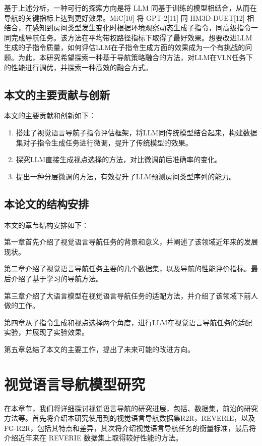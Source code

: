 \documentclass[bachelor]{thesis-uestc}
\begin{document}
基于上述分析，一种可行的探索方向是将 LLM 同基于训练的模型相结合，从而在导航的关键指标上达到更好效果。MiC[10] 将 GPT-2[11] 同 HM3D-DUET[12] 相结合，在感知到房间类型发生变化时根据环境观察动态生成子指令，同高级指令一同完成导航任务。该方法在平均带权路径指标下取得了最好效果。想要改进LLM生成的子指令质量，如何评估LLM在子指令生成方面的效果成为一个有挑战的问题。为此，本研究希望探索一种基于导航策略融合的方法，对LLM在VLN任务下的性能进行调优，并探索一种高效的融合方式。

\section{本文的主要贡献与创新}

本文的主要贡献和创新如下：
\begin{enumerate}
    \item 搭建了视觉语言导航子指令评估框架，将LLM同传统模型结合起来，构建数据集对子指令生成任务进行微调，提升了传统模型的效果。
    \item 探究LLM直接生成视点选择的方法，对比微调前后准确率的变化。
    \item 提出一种分层微调的方法，有效提升了LLM预测房间类型序列的能力。
\end{enumerate}
\section{本论文的结构安排}

本文的章节结构安排如下：

第一章首先介绍了视觉语言导航任务的背景和意义，并阐述了该领域近年来的发展现状。

第二章介绍了视觉语言导航任务主要的几个数据集，以及导航的性能评价指标。最后介绍了基于学习的导航方法。

第三章介绍了大语言模型在视觉语言导航任务的适配方法，并介绍了该领域下前人做的工作。

第四章从子指令生成和视点选择两个角度，进行LLM在视觉语言导航任务的适配实验，并展现了实验效果。

第五章总结了本文的主要工作，提出了未来可能的改进方向。

\chapter{视觉语言导航模型研究}

在本章节，我们将详细探讨视觉语言导航的研究进展，包括、数据集，前沿的研究方法等。首先将介绍本研究使用到的视觉语言导航数据集R2R，REVERIE，以及FG-R2R，包括其特点和差异，其次将介绍视觉语言导航任务的衡量标准，最后将介绍近年来在 REVERIE 数据集上取得较好性能的方法。
\end{document}
